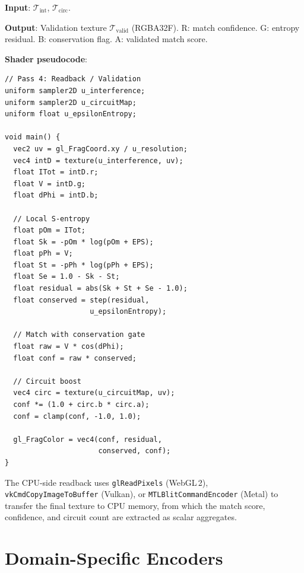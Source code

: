\documentclass[11pt,twocolumn,a4paper]{article}
\begin{document}
\textbf{Input}: $\mathcal{T}_{\text{int}}$, $\mathcal{T}_{\text{circ}}$.

\textbf{Output}: Validation texture $\mathcal{T}_{\text{valid}}$
(RGBA32F). R: match confidence. G: entropy residual. B: conservation
flag. A: validated match score.

\textbf{Shader pseudocode}:
\begin{lstlisting}[style=glsl]
// Pass 4: Readback / Validation
uniform sampler2D u_interference;
uniform sampler2D u_circuitMap;
uniform float u_epsilonEntropy;

void main() {
  vec2 uv = gl_FragCoord.xy / u_resolution;
  vec4 intD = texture(u_interference, uv);
  float ITot = intD.r;
  float V = intD.g;
  float dPhi = intD.b;

  // Local S-entropy
  float pOm = ITot;
  float Sk = -pOm * log(pOm + EPS);
  float pPh = V;
  float St = -pPh * log(pPh + EPS);
  float Se = 1.0 - Sk - St;
  float residual = abs(Sk + St + Se - 1.0);
  float conserved = step(residual,
                    u_epsilonEntropy);

  // Match with conservation gate
  float raw = V * cos(dPhi);
  float conf = raw * conserved;

  // Circuit boost
  vec4 circ = texture(u_circuitMap, uv);
  conf *= (1.0 + circ.b * circ.a);
  conf = clamp(conf, -1.0, 1.0);

  gl_FragColor = vec4(conf, residual,
                      conserved, conf);
}
\end{lstlisting}

The CPU-side readback uses \texttt{glReadPixels} (WebGL\,2),
\texttt{vkCmdCopyImageToBuffer} (Vulkan), or
\texttt{MTLBlitCommandEncoder} (Metal) to transfer the final texture
to CPU memory, from which the match score, confidence, and circuit
count are extracted as scalar aggregates.



\section{Domain-Specific Encoders}
\label{sec:domain_encoders}
\end{document}

